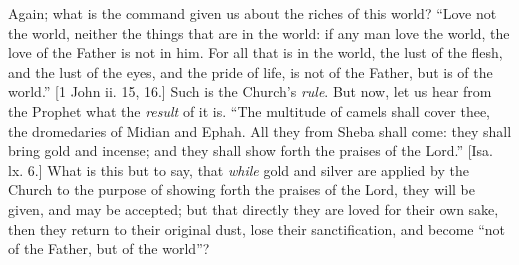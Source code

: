 Again; what is the command given us about the riches of this world?
``Love not the world, neither the things that are in the world: if
any man love the world, the love of the Father is not in him. For all
that is in the world, the lust of the flesh, and the lust of the eyes,
and the pride of life, is not of the Father, but is of the
world.'' [1 John ii. 15, 16.] Such is the Church's \emph{rule}.
But now, let us hear from the Prophet what the \emph{result} of it is.
``The multitude of camels shall cover thee, the dromedaries of
Midian and Ephah. All they from Sheba shall come: they shall bring
gold and incense; and they shall show forth the praises of the
Lord.'' [Isa. lx. 6.] What is this but to say, that \emph{while}
gold and silver are applied by the Church to the purpose of showing
forth the praises of the Lord, they will be given, and may be
accepted; but that directly they are loved for their own sake, then
they return to their original dust, lose their sanctification, and
become ``not of the Father, but of the world''?

